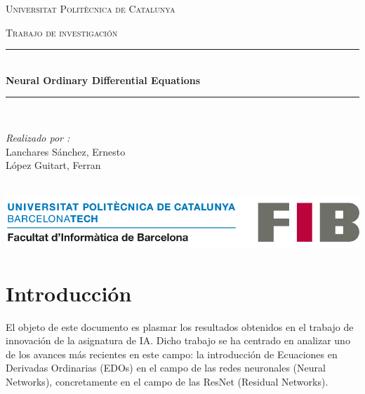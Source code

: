 \documentclass[12pt]{report}
\begin{document}
\begin{titlepage}
    \centering
    \vspace{0.5 cm}
    \begin{center}
        \textsc{\Large Universitat Politècnica de Catalunya}\\[2.0 cm]
    \end{center}%
    \textsc{\Large Trabajo de investigación }\\[0.5 cm]				%
    \rule{\linewidth}{0.2 mm} \\[0.4 cm]
    { \huge \bfseries Neural Ordinary Differential Equations}\\
    \rule{\linewidth}{0.2 mm} \\[1.5 cm]
    
    \vfill

    \begin{minipage}{\textwidth}

        \begin{flushright} \large
            \emph{Realizado por :} \\
            Lanchares Sánchez, Ernesto \\
            López Guitart, Ferran
        \end{flushright}

    \end{minipage}\\[2 cm]

    \includegraphics[scale = 0.3]{UPCLogo.png}
    \vspace{0.5cm}
\end{titlepage}


\tableofcontents

\chapter{Introducción}

El objeto de este documento es plasmar los resultados obtenidos en el trabajo de
innovación de la asignatura de IA. Dicho trabajo se ha centrado en analizar uno
de los avances más recientes en este campo: la introducción de Ecuaciones en
Derivadas Ordinarias (EDOs) en el campo de las redes neuronales (Neural
Networks), concretamente en el campo de las ResNet (Residual Networks).
\end{document}
